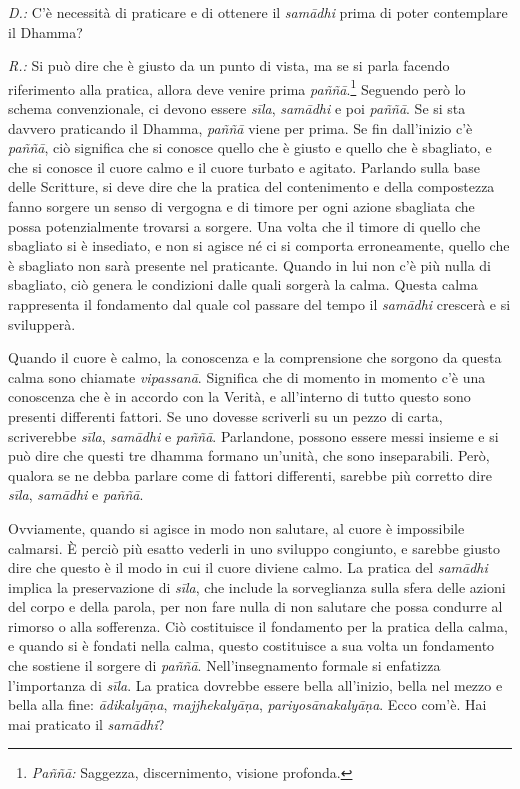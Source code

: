 \emph{D.:} C'è necessità di praticare e di ottenere il \emph{samādhi} prima di
poter contemplare il Dhamma?

\emph{R.:} Si può dire che è giusto da un punto di vista, ma se si parla
facendo riferimento alla pratica, allora deve venire prima
\emph{paññā}.\footnote{\emph{Paññā:} Saggezza, discernimento, visione
  profonda.} Seguendo però lo schema convenzionale, ci devono essere
\emph{sīla}, \emph{samādhi} e poi \emph{paññā}. Se si sta davvero
praticando il Dhamma, \emph{paññā} viene per prima. Se fin dall'inizio
c'è \emph{paññā}, ciò significa che si conosce quello che è giusto e
quello che è sbagliato, e che si conosce il cuore calmo e il cuore
turbato e agitato. Parlando sulla base delle Scritture, si deve dire che
la pratica del contenimento e della compostezza fanno sorgere un senso
di vergogna e di timore per ogni azione sbagliata che possa
potenzialmente trovarsi a sorgere. Una volta che il timore di quello che
sbagliato si è insediato, e non si agisce né ci si comporta
erroneamente, quello che è sbagliato non sarà presente nel praticante.
Quando in lui non c'è più nulla di sbagliato, ciò genera le condizioni
dalle quali sorgerà la calma. Questa calma rappresenta il fondamento dal
quale col passare del tempo il \emph{samādhi} crescerà e si svilupperà.

Quando il cuore è calmo, la conoscenza e la comprensione che sorgono da
questa calma sono chiamate \emph{vipassanā}. Significa che di momento in
momento c'è una conoscenza che è in accordo con la Verità, e all'interno
di tutto questo sono presenti differenti fattori. Se uno dovesse
scriverli su un pezzo di carta, scriverebbe \emph{sīla}, \emph{samādhi}
e \emph{paññā}. Parlandone, possono essere messi insieme e si può dire
che questi tre dhamma formano un'unità, che sono inseparabili.
Però, qualora se ne debba parlare come di fattori differenti, sarebbe
più corretto dire \emph{sīla}, \emph{samādhi} e \emph{paññā}.

Ovviamente, quando si agisce in modo non salutare, al cuore è
impossibile calmarsi. È perciò più esatto vederli in uno sviluppo
congiunto, e sarebbe giusto dire che questo è il modo in cui il cuore
diviene calmo. La pratica del \emph{samādhi} implica la preservazione di
\emph{sīla}, che include la sorveglianza sulla sfera delle azioni del
corpo e della parola, per non fare nulla di non salutare che possa
condurre al rimorso o alla sofferenza. Ciò costituisce il fondamento per
la pratica della calma, e quando si è fondati nella calma, questo
costituisce a sua volta un fondamento che sostiene il sorgere di
\emph{paññā}. Nell'insegnamento formale si enfatizza l'importanza di
\emph{sīla}. La pratica dovrebbe essere bella all'inizio, bella nel
mezzo e bella alla fine: \emph{ādikalyāṇa}, \emph{majjhekalyāṇa},
\emph{pariyosānakalyāṇa}. Ecco com'è. Hai mai praticato il
\emph{samādhi}?

